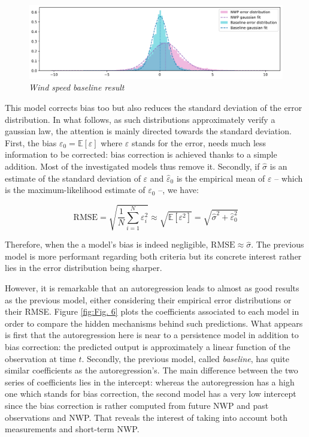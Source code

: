\documentclass{article}
\newcommand{\saut}{\vspace{10px}}
\begin{document}
\begin{figure}[H]
    \centering
    \includegraphics[width=\linewidth]{img/baseline.png}
    \caption{\textit{Wind speed baseline result}}
    \label{fig:Fig. 5}
\end{figure}

This model corrects bias too but also reduces the standard deviation of the error distribution. In what follows,
as such distributions approximately verify a gaussian law, the attention is mainly directed towards the standard
deviation. First, the bias $\varepsilon_0 = \mathbb E [ \varepsilon ]$ where $\varepsilon$ stands for the error,
needs much less information to be corrected: bias correction is achieved thanks to a simple addition.
Most of the investigated models thus remove it. Secondly, if $\hat \sigma$ is an estimate
of the standard deviation of $\varepsilon$ and $\hat \varepsilon_0$ is the empirical mean
of $\varepsilon$ -- which is the maximum-likelihood estimate of $\varepsilon_0$ --, we have:

\[
	\mathrm{RMSE} = \sqrt{\frac{1}{N} \sum_{i = 1}^N \varepsilon^2_i} \approx \sqrt{ \mathbb E [\varepsilon^2] }
	= \sqrt{\hat \sigma^2 + \hat \varepsilon^2_0}
\]

Therefore, when the a model's bias is indeed negligible, $\mathrm{RMSE} \approx \hat \sigma$.
The previous model is more performant regarding both criteria but its concrete interest
rather lies in the error distribution being sharper.

\saut

However, it is remarkable that an autoregression leads to almost as good results as the previous model, either
considering their empirical error distributions or their RMSE. Figure \ref{fig:Fig. 6} plots the coefficients associated to
each model in order to compare the hidden mechanisms behind such predictions. What appears is first that
the autoregression here is near to a persistence model in addition to bias correction: the predicted output is
approximately a linear function of the observation at time $t$. Secondly, the previous model, called \emph{baseline},
has quite similar coefficients as the autoregression's. The main difference between the two series of coefficients
lies in the intercept: whereas the autoregression has a high one which stands for bias correction, the second model
has a very low intercept since the bias correction is rather computed from future NWP and past observations and NWP.
That reveals the interest of taking into account both measurements and short-term NWP.
\end{document}
